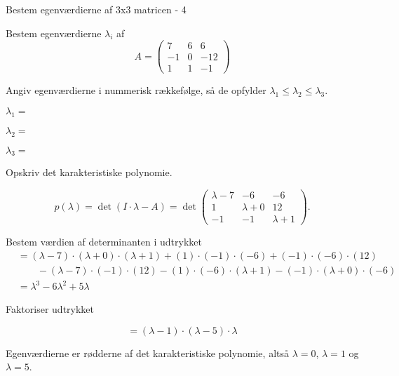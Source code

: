 \documentclass{article}
\begin{document}
\begin{exercise}{Bestem egenværdierne af 3x3 matricen - 4}

Bestem egenværdierne $\lambda_i$ af 
\[
A=\begin{pmatrix}
7 & 6 & 6 \\
-1 & 0 & -12 \\
1 & 1 & -1
\end{pmatrix}
\]

Angiv egenværdierne i nummerisk rækkefølge, så de
opfylder $\lambda_1 \le \lambda_2 \le \lambda_3$.

$\lambda_1 = $ 

$\lambda_2 = $ 

$\lambda_3 = $ 

\hint
Opskriv det karakteristiske polynomie.

\hint
\[
p(\lambda)=\det\left(I \cdot \lambda - A \right)=\det\begin{pmatrix}
\lambda - 7 & -6 & -6 \\
1 & \lambda + 0 & 12 \\
-1 & -1 & \lambda + 1
\end{pmatrix}.
\]

\hint
Bestem værdien af determinanten i udtrykket
\begin{align*}
&=(\lambda-7) \cdot (\lambda+0) \cdot (\lambda+1)+(1) \cdot (-1) \cdot (-6)+(-1) \cdot (-6) \cdot (12) \\
&\qquad-(\lambda-7) \cdot (-1) \cdot (12)-(1) \cdot (-6) \cdot (\lambda+1)-(-1) \cdot (\lambda+0) \cdot (-6) \\
&=\lambda^3-6\lambda^2+5\lambda
\end{align*}

\hint
Faktoriser udtrykket

\hint
\[
=(\lambda-1) \cdot (\lambda-5) \cdot \lambda
\]

\hint
Egenværdierne er rødderne af det karakteristiske polynomie, 
altså
$\lambda=0$, $\lambda=1$ og $\lambda=5$.

\end{exercise}
\end{document}
